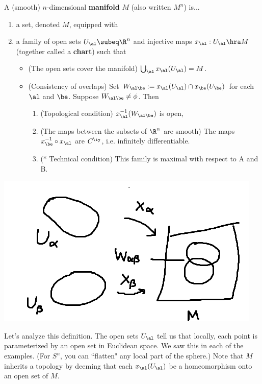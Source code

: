 \begin{df}
A (smooth) $n$-dimensional \textbf{manifold} $M$ (also written $M^n$) is...
\begin{enumerate}
\item
a set, denoted $M$, equipped with
\item 
a family of open sets $U_{\al}\subeq \R^n$ and injective maps $x_{\al}:U_{\al}\hra M$ (together called a \textbf{chart}) such that
\begin{itemize}
\item
(The open sets cover the manifold) $\bigcup_{\al} x_{\al}(U_{\al})=M$. 
\item
(Consistency of overlaps) Set $W_{\al\be}:=x_{\al}(U_{\al})\cap x_{\be}(U_{\be})$ for each $\al$ and $\be$. Suppose $W_{\al\be}\ne \phi$.
Then 
\begin{enumerate}
\item
(Topological condition)
$x_{\al}^{-1}(W_{\al\be})$ is open,
\item
(The maps between the subsets of $\R^n$ are smooth)
The maps $x_{\be}^{-1}\circ x_{\al}$ are $C^{\iy}$, i.e. infinitely differentiable. %
\item
(* Technical condition) This family is maximal with respect to A and B.
\end{enumerate}
\end{itemize}
\end{enumerate}
\end{df}

\includegraphics{1-1}

Let's analyze this definition. 
The open sets $U_{\al}$ tell us that locally, each point is  parameterized by an open set in Euclidean space. %
We saw this in each of the examples. (For $S^n$, you can ``flatten" any local part of the sphere.) 
Note that $M$ inherits a topology by deeming that each $x_{\al}(U_{\al})$ be a homeomorphism onto an open set of $M$.


